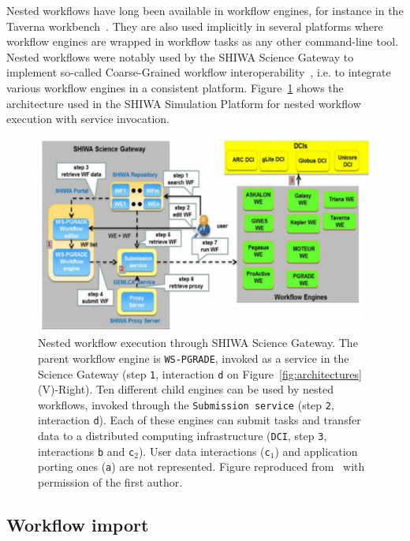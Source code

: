 \documentclass[preprint,3p,twocolumn]{elsarticle}
\begin{document}
Nested workflows have long been available in workflow engines, for
instance in the Taverna workbench~\cite{oinn2004taverna}. They are
also used implicitly in several platforms where workflow engines are
wrapped in workflow tasks as any other command-line tool. Nested
workflows were notably used by the SHIWA Science Gateway to implement
so-called Coarse-Grained workflow
interoperability~\cite{terstyanszky2014enabling}, i.e. to integrate
various workflow engines in a consistent
platform. Figure~\ref{fig:shiwa-architecture} shows the architecture
used in the SHIWA Simulation Platform for nested workflow execution
with service invocation.
\begin{figure}
\centering
\includegraphics[width=1.5\columnwidth]{figures/shiwa-science-gateway.pdf}
\caption{Nested workflow execution through SHIWA Science Gateway. The
  parent workflow engine is \texttt{WS-PGRADE}, invoked as a service
  in the Science Gateway (step \texttt{1}, interaction \texttt{d} on
  Figure~\ref{fig:architectures}(V)-Right). Ten different child engines can be used by nested
  workflows, invoked through the \texttt{Submission service} (step
  \texttt{2}, interaction \texttt{d}). Each of these engines can
  submit tasks and transfer data to a distributed computing
  infrastructure (\texttt{DCI}, step \texttt{3}, interactions
  \texttt{b} and \texttt{c$_2$}). User data interactions (\texttt{c$_1$}) and
  application porting ones (\texttt{a}) are not represented. Figure
  reproduced from~\cite{terstyanszky2014enabling} with permission of
  the first author.}
\label{fig:shiwa-architecture}
\end{figure}

\subsection{Workflow import}
\end{document}
